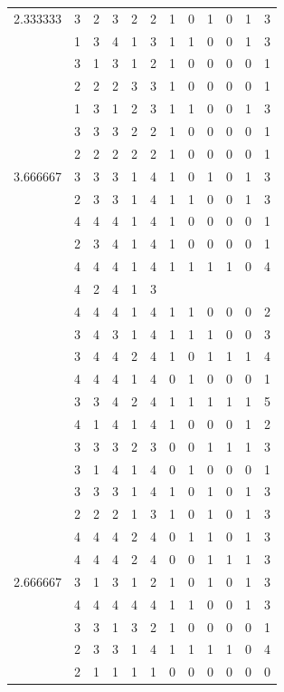 \documentclass[]{book}
\theoremstyle{definition}
\theoremstyle{definition}
\theoremstyle{definition}
\theoremstyle{remark}
\begin{document}
\begin{table}
{\begin{tabular}[t]{rrrrrrrrrrrr}
2.333333 & 3 & 2 & 3 & 2 & 2 & 1 & 0 & 1 & 0 & 1 & 3\\
 & 1 & 3 & 4 & 1 & 3 & 1 & 1 & 0 & 0 & 1 & 3\\
 & 3 & 1 & 3 & 1 & 2 & 1 & 0 & 0 & 0 & 0 & 1\\
 & 2 & 2 & 2 & 3 & 3 & 1 & 0 & 0 & 0 & 0 & 1\\
 & 1 & 3 & 1 & 2 & 3 & 1 & 1 & 0 & 0 & 1 & 3\\
 & 3 & 3 & 3 & 2 & 2 & 1 & 0 & 0 & 0 & 0 & 1\\
 & 2 & 2 & 2 & 2 & 2 & 1 & 0 & 0 & 0 & 0 & 1\\
3.666667 & 3 & 3 & 3 & 1 & 4 & 1 & 0 & 1 & 0 & 1 & 3\\
 & 2 & 3 & 3 & 1 & 4 & 1 & 1 & 0 & 0 & 1 & 3\\
 & 4 & 4 & 4 & 1 & 4 & 1 & 0 & 0 & 0 & 0 & 1\\
 & 2 & 3 & 4 & 1 & 4 & 1 & 0 & 0 & 0 & 0 & 1\\
 & 4 & 4 & 4 & 1 & 4 & 1 & 1 & 1 & 1 & 0 & 4\\
 & 4 & 2 & 4 & 1 & 3 &  &  &  &  &  & \\
 & 4 & 4 & 4 & 1 & 4 & 1 & 1 & 0 & 0 & 0 & 2\\
 & 3 & 4 & 3 & 1 & 4 & 1 & 1 & 1 & 0 & 0 & 3\\
 & 3 & 4 & 4 & 2 & 4 & 1 & 0 & 1 & 1 & 1 & 4\\
 & 4 & 4 & 4 & 1 & 4 & 0 & 1 & 0 & 0 & 0 & 1\\
 & 3 & 3 & 4 & 2 & 4 & 1 & 1 & 1 & 1 & 1 & 5\\
 & 4 & 1 & 4 & 1 & 4 & 1 & 0 & 0 & 0 & 1 & 2\\
 & 3 & 3 & 3 & 2 & 3 & 0 & 0 & 1 & 1 & 1 & 3\\
 & 3 & 1 & 4 & 1 & 4 & 0 & 1 & 0 & 0 & 0 & 1\\
 & 3 & 3 & 3 & 1 & 4 & 1 & 0 & 1 & 0 & 1 & 3\\
 & 2 & 2 & 2 & 1 & 3 & 1 & 0 & 1 & 0 & 1 & 3\\
 & 4 & 4 & 4 & 2 & 4 & 0 & 1 & 1 & 0 & 1 & 3\\
 & 4 & 4 & 4 & 2 & 4 & 0 & 0 & 1 & 1 & 1 & 3\\
2.666667 & 3 & 1 & 3 & 1 & 2 & 1 & 0 & 1 & 0 & 1 & 3\\
 & 4 & 4 & 4 & 4 & 4 & 1 & 1 & 0 & 0 & 1 & 3\\
 & 3 & 3 & 1 & 3 & 2 & 1 & 0 & 0 & 0 & 0 & 1\\
 & 2 & 3 & 3 & 1 & 4 & 1 & 1 & 1 & 1 & 0 & 4\\
 & 2 & 1 & 1 & 1 & 1 & 0 & 0 & 0 & 0 & 0 & 0\\

\end{tabular}}
\end{table}
\end{document}

